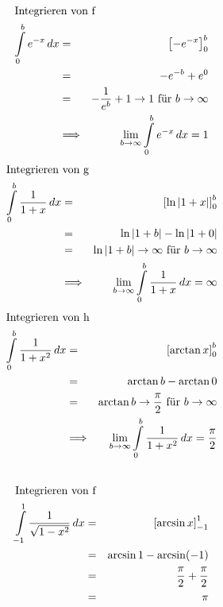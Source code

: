 \documentclass[10pt,a4paper,oneside,ngerman,numbers=noenddot]{scrartcl}
\begin{document}
\subsection{} %
\begin{alignat*}{2}
\intertext{Integrieren von f}
\int\limits_{0}^{b} e^{-x}\,dx &=& \left[ -e^{-x}\right]_{0}^{b} \\
&=& -e^{-b} + e^{0} \\
&=& -\frac{1}{e^{b}} + 1 \rightarrow 1 \text{ für } b \rightarrow \infty \\
&\Longrightarrow & \lim\limits_{b \rightarrow \infty} \int\limits_{0}^{b} e^{-x}\,dx = 1
\end{alignat*}
\begin{alignat*}{2}
\intertext{Integrieren von g}
\int\limits_{0}^{b} \frac{1}{1+x}\,dx &=& \left[\ln |1+x|\right]_{0}^{b} \\
&=& \ln |1 + b| - \ln |1 + 0| \\
&=& \ln |1 + b| \rightarrow \infty \text{ für } b \rightarrow \infty \\
&\Longrightarrow & \lim\limits_{b \rightarrow \infty} \int\limits_{0}^{b} \frac{1}{1+x}\,dx = \infty
\end{alignat*}
\begin{alignat*}{2}
\intertext{Integrieren von h}
\int\limits_{0}^{b} \frac{1}{1+x^{2}} \,dx &=& \left[ \arctan x \right]_{0}^{b} \\
&=& \arctan b - \arctan 0 \\
&=& \arctan b \rightarrow \frac{\pi}{2} \text{ für } b \rightarrow \infty \\
&\Longrightarrow & \lim\limits_{b \rightarrow \infty} \int\limits_{0}^{b} \frac{1}{1+x^{2}}\,dx = \frac{\pi}{2}
\end{alignat*}
\subsection{} %
\begin{alignat*}{2}
\intertext{Integrieren von f}
\int\limits_{-1}^{1} \frac{1}{\sqrt{1-x^{2}}}\,dx &=& \left[\arcsin x\right]_{-1}^{1} \\
&=& \arcsin 1 - \arcsin (-1) \\
&=& \frac{\pi}{2} + \frac{\pi}{2}\\
&=& \pi
\end{alignat*}
\end{document}
